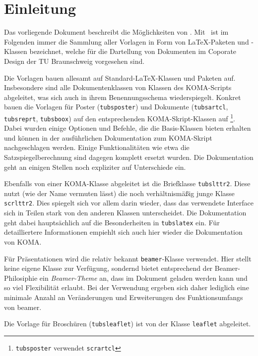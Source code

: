 \chapter{Einleitung}

Das vorliegende Dokument beschreibt die Möglichkeiten von \tubslatex.
Mit \tubslatex\ ist im Folgenden immer die Sammlung aller Vorlagen in Form
von \LaTeX-Paketen und -Klassen bezeichnet, welche für die Dartellung von
Dokumenten im Coporate Design der TU Braunschweig vorgesehen sind.

Die Vorlagen bauen allesamt auf Standard-\LaTeX-Klassen und Paketen auf.
Insbesondere sind alle Dokumentenklassen von Klassen des KOMA-Scripts
abgeleitet, was sich auch in ihrem Benennungsschema wiederspiegelt.
Konkret bauen die Vorlagen für Poster (\texttt{tubsposter}) und Dokumente
(\texttt{tubsartcl}, \texttt{tubsreprt}, \texttt{tubsboox}) auf
den entsprechenden KOMA-Skript-Klassen auf%
\footnote{\texttt{tubsposter} verwendet \texttt{scrartcl}}.
Dabei wurden einige Optionen und Befehle, die die Basis-Klassen bieten erhalten
und können in der ausführlichen Dokumentation zum KOMA-Skript\cite{koma-skript}
nachgeschlagen werden.
Einige Funktionalitäten wie etwa die Satzspiegelberechnung sind dagegen
komplett ersetzt wurden.
Die Dokumentation geht an einigen Stellen noch expliziter auf Unterschiede ein.

Ebenfalls von einer KOMA-Klasse abgeleitet ist die Briefklasse
\texttt{tubslttr2}.
Diese nutzt (wie der Name vermuten lässt) die noch verhältnismäßig junge
Klasse \texttt{scrlttr2}. Dies spiegelt sich vor allem darin wieder, dass
das verwendete Interface sich in Teilen stark von den anderen Klassen unterscheidet. Die Dokumentation geht dabei hauptsächlich auf die Besonderheiten in \texttt{tubslatex} ein. Für detailliertere Informationen empiehlt sich auch hier wieder die Dokumentation von KOMA\cite{koma-skript}.

Für Präsentationen wird die relativ bekannt \texttt{beamer}-Klasse verwendet. Hier stellt \tubslatex keine eigene Klasse zur Verfügung, sondernd bietet entsprechend der Beamer-Philosiphie ein \emph{Beamer-Theme} an, dass
im Dokument geladen werden kann und so viel Flexibilität erlaubt.
Bei der Verwendung ergeben sich daher lediglich eine minimale Anzahl an
Veränderungen und Erweiterungen des Funktionsumfangs von beamer.

Die Vorlage für Broschüren (\texttt{tubsleaflet}) ist
von der Klasse \texttt{leaflet} abgeleitet.\par

